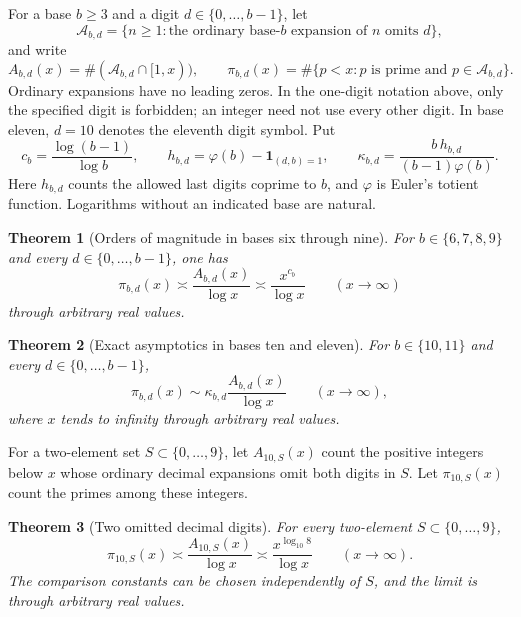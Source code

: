 \documentclass[11pt,a4paper]{article}
\theoremstyle{paperplain}
\newtheorem{theorem}{Theorem}[section]
\numberwithin{equation}{section}
\begin{document}
For a base $b\geqslant3$ and a digit $d\in\{0,\ldots,b-1\}$, let
\[
 \mathscr A_{b,d}
 =\{n\geqslant1:\text{the ordinary base-}b
                    \text{ expansion of }n\text{ omits }d\},
\]
and write
\[
 A_{b,d}(x)=\#(\mathscr A_{b,d}\cap[1,x)),\qquad
 \pi_{b,d}(x)=\#\{p<x:p\text{ is prime and }p\in\mathscr A_{b,d}\}.
\]
Ordinary expansions have no leading zeros. In the one-digit
notation above, only the specified digit is forbidden; an integer need not use every other digit. In base eleven,
$d=10$ denotes the eleventh digit symbol. Put
\begin{equation}\label{intro:constants}
 c_b=\frac{\log(b-1)}{\log b},\qquad
 h_{b,d}=\varphi(b)-\mathbf1_{(d,b)=1},\qquad
 \kappa_{b,d}=\frac{b\,h_{b,d}}{(b-1)\varphi(b)}.
\end{equation}
Here $h_{b,d}$ counts the allowed last digits coprime to $b$, and
$\varphi$ is Euler's totient function. Logarithms without an indicated
base are natural.

\begin{theorem}[Orders of magnitude in bases six through nine]
\label{main:order}
For $b\in\{6,7,8,9\}$ and every $d\in\{0,\ldots,b-1\}$, one has
\[
 \pi_{b,d}(x)\asymp\frac{A_{b,d}(x)}{\log x}
 \asymp\frac{x^{c_b}}{\log x}
 \qquad(x\to\infty)
\]
through arbitrary real values.
\end{theorem}

\begin{theorem}[Exact asymptotics in bases ten and eleven]
\label{main:exact}
For $b\in\{10,11\}$ and every $d\in\{0,\ldots,b-1\}$,
\begin{equation}\label{main:asymptotic}
 \pi_{b,d}(x)\sim
 \kappa_{b,d}\frac{A_{b,d}(x)}{\log x}
 \qquad(x\to\infty),
\end{equation}
where $x$ tends to infinity through arbitrary real values.
\end{theorem}

For a two-element set \(S\subset\{0,\ldots,9\}\), let \(A_{10,S}(x)\)
count the positive integers below \(x\) whose ordinary decimal expansions
omit both digits in \(S\). Let \(\pi_{10,S}(x)\) count the primes among
these integers.

\begin{theorem}[Two omitted decimal digits]\label{main:two-decimal}
For every two-element \(S\subset\{0,\ldots,9\}\),
\[
 \pi_{10,S}(x)\asymp\frac{A_{10,S}(x)}{\log x}
                 \asymp\frac{x^{\log_{10}8}}{\log x}
 \qquad(x\to\infty).
\]
The comparison constants can be chosen independently of \(S\), and
the limit is through arbitrary real values.
\end{theorem}
\end{document}
